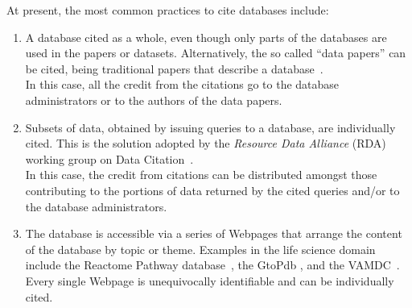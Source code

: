 At present, the most common practices to cite databases include:
\begin{enumerate}
    \item A database cited as a whole, even though only parts of the databases are used in the papers or datasets. Alternatively, the so called ``data papers'' can be cited, being traditional papers that describe a database~\citep{CandelaEtAl2015}. \\
    In this case, all the credit from the citations go to the database administrators or to the authors of the data papers. 
    \item Subsets of data, obtained by issuing queries to a database, are individually cited. This is the solution adopted by the \emph{Resource Data Alliance} (RDA) working group on Data Citation~\citep{RauberEtAl2016}. \\
    In this case, the credit from citations can be distributed amongst those contributing to the portions of data returned by the cited queries and/or to the database administrators. 
    \item The database is accessible via a series of Webpages that arrange the content of the database by topic or theme. Examples in the life science domain include the Reactome Pathway database~\citep{reactome2016}, the GtoPdb \citep{iuphar2018}, and the VAMDC~\citep{ZwolfEtAl2016}.
     Every single Webpage is unequivocally identifiable and can be individually cited. 
    
\end{enumerate}

